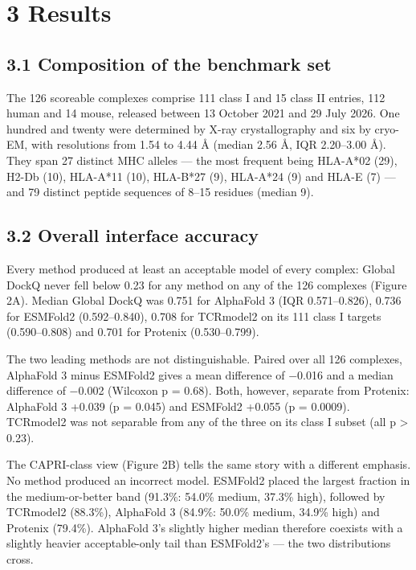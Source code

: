 \documentclass[
  11pt,
]{article}
\begin{document}
\section{3 Results}\label{results}

\subsection{3.1 Composition of the benchmark
set}\label{composition-of-the-benchmark-set}

The 126 scoreable complexes comprise 111 class I and 15 class II
entries, 112 human and 14 mouse, released between 13 October 2021 and 29
July 2026. One hundred and twenty were determined by X-ray
crystallography and six by cryo-EM, with resolutions from 1.54 to 4.44 \AA{}
(median 2.56 \AA{}, IQR 2.20--3.00 \AA{}). They span 27 distinct MHC alleles ---
the most frequent being HLA-A*02 (29), H2-Db (10), HLA-A*11 (10),
HLA-B*27 (9), HLA-A*24 (9) and HLA-E (7) --- and 79 distinct peptide
sequences of 8--15 residues (median 9).

\subsection{3.2 Overall interface
accuracy}\label{overall-interface-accuracy}

Every method produced at least an acceptable model of every complex:
Global DockQ never fell below 0.23 for any method on any of the 126
complexes (Figure 2A). Median Global DockQ was 0.751 for AlphaFold 3
(IQR 0.571--0.826), 0.736 for ESMFold2 (0.592--0.840), 0.708 for
TCRmodel2 on its 111 class I targets (0.590--0.808) and 0.701 for
Protenix (0.530--0.799).

The two leading methods are not distinguishable. Paired over all 126
complexes, AlphaFold 3 minus ESMFold2 gives a mean difference of \ensuremath{-}0.016
and a median difference of \ensuremath{-}0.002 (Wilcoxon p = 0.68). Both, however,
separate from Protenix: AlphaFold 3 +0.039 (p = 0.045) and ESMFold2
+0.055 (p = 0.0009). TCRmodel2 was not separable from any of the three
on its class I subset (all p \textgreater{} 0.23).

The CAPRI-class view (Figure 2B) tells the same story with a different
emphasis. No method produced an incorrect model. ESMFold2 placed the
largest fraction in the medium-or-better band (91.3\%: 54.0\% medium,
37.3\% high), followed by TCRmodel2 (88.3\%), AlphaFold 3 (84.9\%:
50.0\% medium, 34.9\% high) and Protenix (79.4\%). AlphaFold 3's
slightly higher median therefore coexists with a slightly heavier
acceptable-only tail than ESMFold2's --- the two distributions cross.
\end{document}
